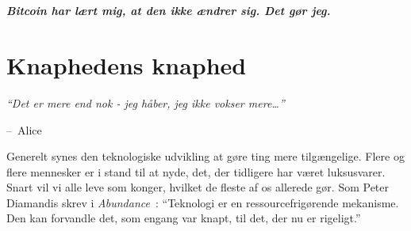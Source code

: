 \documentclass[paper=6in:9in,pagesize=pdftex,headinclude=on,footinclude=on,12pt]{scrbook}
\makeatletter
\newenvironment{chapquote}[2][4em]{\setlength{\@tempdima}{#1}%
   \def\chapquote@author{#2}%
   \parshape 1 \@tempdima \dimexpr\textwidth-2\@tempdima\relax%
   \itshape}{\par\normalfont\hfill--\ \chapquote@author\hspace*{\@tempdima}\par\bigskip}
\makeatother
\begin{document}
~\paragraph{Bitcoin har lært mig, at den ikke ændrer sig. Det gør jeg.}%
%
%
%
%
%
%
%
%
%

\chapter{Knaphedens knaphed}
\label{les:2}

\begin{chapquote}{Alice}
\enquote{Det er mere end nok - jeg håber, jeg ikke vokser mere\ldots}
\end{chapquote}

Generelt synes den teknologiske udvikling at gøre ting mere tilgængelige. Flere og flere mennesker er i stand til at nyde, det, der tidligere har været luksusvarer. Snart vil vi alle leve som konger, hvilket de fleste af os allerede gør. Som Peter Diamandis skrev i \textit{Abundance}~\cite{abundance}: \enquote{Teknologi er en ressourcefrigørende mekanisme. Den kan forvandle det, som engang var knapt, til det, der nu er rigeligt.}
\end{document}
